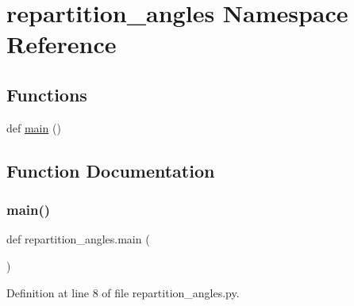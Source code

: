 \hypertarget{namespacerepartition__angles}{}\section{repartition\+\_\+angles Namespace Reference}
\label{namespacerepartition__angles}
\subsection*{Functions}
\begin{DoxyCompactItemize}
\item 
def \hyperlink{namespacerepartition__angles_a30e41ab51dc324256ca4c02bad18f22b}{main} ()
\end{DoxyCompactItemize}


\subsection{Function Documentation}
\mbox{\label{namespacerepartition__angles_a30e41ab51dc324256ca4c02bad18f22b}} 
\subsubsection{\texorpdfstring{main()}{main()}}
{\footnotesize\ttfamily def repartition\+\_\+angles.\+main (\begin{DoxyParamCaption}{ }\end{DoxyParamCaption})}



Definition at line 8 of file repartition\+\_\+angles.\+py.

